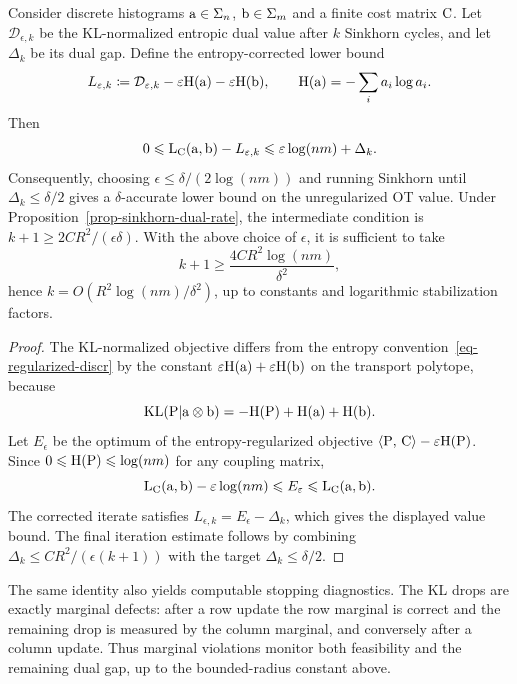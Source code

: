 \begin{cor}\label{cor-sinkhorn-dual-complexity}
	Consider discrete histograms $\mathrm{a}\in\Sigma_n$, $\mathrm{b}\in\Sigma_m$ and a finite cost matrix $\mathrm{C}$. Let $\mathcal D_{\epsilon,k}$ be the KL-normalized entropic dual value after $k$ Sinkhorn cycles, and let $\Delta_k$ be its dual gap. Define the entropy-corrected lower bound
	\[
		L_{\varepsilon,k}
		\coloneqq
		\mathcal D_{\varepsilon,k}
		-\varepsilon\mathrm{H}(\mathrm{a})-\varepsilon\mathrm{H}(\mathrm{b}),
		\qquad
		\mathrm{H}(\mathrm{a})=-\sum_i a_i\log a_i .
	\]
	Then
	\[
		0\leqslant
		\mathrm{L}_{\mathrm{C}}(\mathrm{a},\mathrm{b})-L_{\varepsilon,k}
		\leqslant
		\varepsilon\log(nm)+\Delta_k .
	\]
	Consequently, choosing $\epsilon\leq\delta/(2\log(nm))$ and running Sinkhorn until $\Delta_k\leq\delta/2$ gives a $\delta$-accurate lower bound on the unregularized OT value. Under Proposition~\ref{prop-sinkhorn-dual-rate}, the intermediate condition is $k+1 \geq 2 C R^2/(\epsilon\delta)$. With the above choice of $\epsilon$, it is sufficient to take
	\[
		k+1 \geq \frac{4 C R^2\log(nm)}{\delta^2},
	\]
	hence $k=O(R^2\log(nm)/\delta^2)$, up to constants and logarithmic stabilization factors.
\end{cor}
\begin{proof}
	The KL-normalized objective differs from the entropy convention~\eqref{eq-regularized-discr} by the constant $\varepsilon\mathrm{H}(\mathrm{a})+\varepsilon\mathrm{H}(\mathrm{b})$ on the transport polytope, because
	\[
		\mathrm{KL}(\mathrm{P}|\mathrm{a}\otimes\mathrm{b})
		=
		-\mathrm{H}(\mathrm{P})+\mathrm{H}(\mathrm{a})+\mathrm{H}(\mathrm{b}).
	\]
	Let $E_\epsilon$ be the optimum of the entropy-regularized objective $\langle \mathrm{P},\,\mathrm{C}\rangle-\varepsilon\mathrm{H}(\mathrm{P})$. Since $0\leqslant\mathrm{H}(\mathrm{P})\leqslant\log(nm)$ for any coupling matrix,
	\[
		\mathrm{L}_{\mathrm{C}}(\mathrm{a},\mathrm{b})-\varepsilon\log(nm)
		\leqslant
		E_\varepsilon
		\leqslant
		\mathrm{L}_{\mathrm{C}}(\mathrm{a},\mathrm{b}).
	\]
	The corrected iterate satisfies $L_{\epsilon,k}=E_\epsilon-\Delta_k$, which gives the displayed value bound. The final iteration estimate follows by combining $\Delta_k\leq C R^2/(\epsilon(k+1))$ with the target $\Delta_k\leq\delta/2$.
\end{proof}

The same identity also yields computable stopping diagnostics. The KL drops are exactly marginal defects: after a row update the row marginal is correct and the remaining drop is measured by the column marginal, and conversely after a column update. Thus marginal violations monitor both feasibility and the remaining dual gap, up to the bounded-radius constant above.

